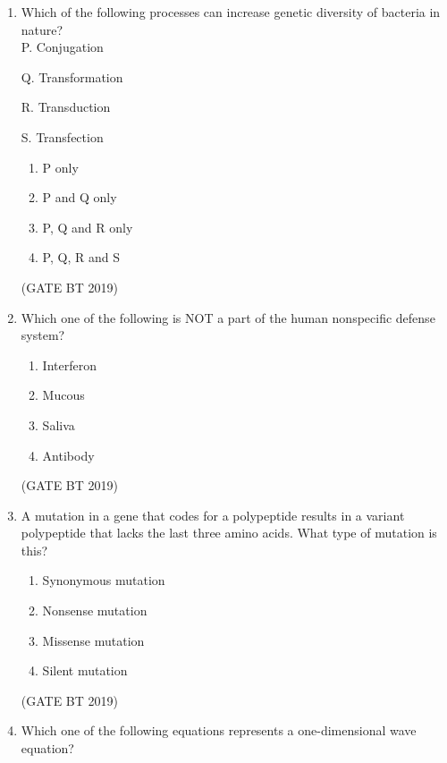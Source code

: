 \documentclass[journal,12pt,onecolumn]{IEEEtran}
\begin{document}
\begin{enumerate}
\item Which of the following processes can increase genetic diversity of bacteria in nature? \\[4pt]
P. Conjugation 

Q. Transformation 

R. Transduction 

S. Transfection

\begin{multicols}{4}
\begin{enumerate}
\item P only
\item P and Q only
\item P, Q and R only
\item P, Q, R and S
\end{enumerate}
\end{multicols}\hfill(GATE BT 2019)

\item Which one of the following is NOT a part of the human nonspecific defense system?

\begin{multicols}{4}
\begin{enumerate}
\item Interferon
\item Mucous
\item Saliva
\item Antibody
\end{enumerate}
\end{multicols}\hfill(GATE BT 2019)


    \item A mutation in a gene that codes for a polypeptide results in a variant polypeptide that lacks the last three amino acids. What type of mutation is this?
    \begin{multicols}{2}
    \begin{enumerate}[label=(\Alph*)]
        \item Synonymous mutation  
        \item Nonsense mutation  
        \item Missense mutation  
        \item Silent mutation  
    \end{enumerate}
    \end{multicols}\hfill(GATE BT 2019)

   \item Which one of the following equations represents a one-dimensional wave equation?


\end{enumerate}
\end{document}
